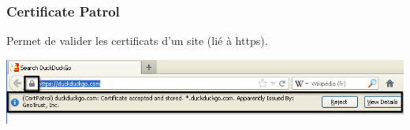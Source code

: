 \begin{frame}
\frametitle{Certificate Patrol}
Permet de valider les certificats d'un site (lié à https).
\begin{center}
\includegraphics[scale=0.4] {./materials/CertificatePatrol.png}
\end{center}
\end{frame}

